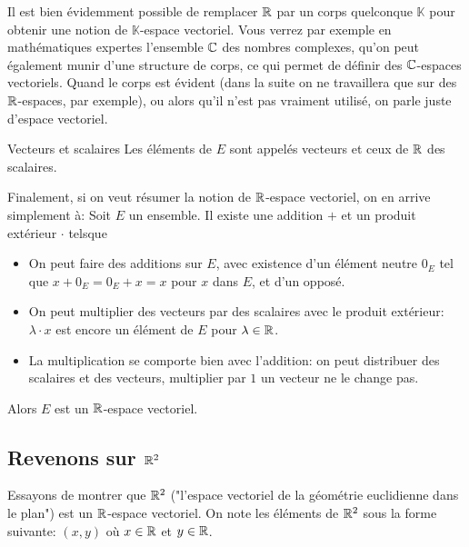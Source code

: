\documentclass{classe}
\renewcommand*{\K}{\mathbb{K}}
\begin{document}
Il est bien évidemment possible de remplacer $\mathbb{R}$ par un corps quelconque $\K$ pour obtenir une notion de $\K$-espace vectoriel.
Vous verrez par exemple en mathématiques expertes l'ensemble $\mathbb{C}$ des nombres complexes, qu'on peut également munir d'une structure de corps, ce qui permet de définir des $\mathbb{C}$-espaces vectoriels.
Quand le corps est évident (dans la suite on ne travaillera que sur des $\mathbb{R}$-espaces, par exemple), ou alors qu'il n'est pas vraiment utilisé, on parle juste d'espace vectoriel.

\begin{définition}{Vecteurs et scalaires}{}
	Les éléments de $E$ sont appelés vecteurs et ceux de $\mathbb{R}$ des scalaires.
\end{définition}

Finalement, si on veut résumer la notion de $\mathbb{R}$-espace vectoriel, on en arrive simplement à:
Soit $E$ un ensemble. Il existe une addition $+$ et un produit extérieur $\cdot$ telsque
\begin{itemize}
		\item On peut faire des additions sur $E$, avec existence d'un élément neutre $0_E$ tel que $x + 0_E = 0_E + x = x$ pour $x$ dans $E$, et d'un opposé.
		\item On peut multiplier des vecteurs par des scalaires avec le produit extérieur: $\lambda\cdot x$ est encore un élément de $E$ pour $\lambda \in \mathbb{R}$.
		\item La multiplication se comporte bien avec l'addition: on peut distribuer des scalaires et des vecteurs, multiplier par $1$ un vecteur ne le change pas.
\end{itemize}
Alors $E$ est un $\mathbb{R}$-espace vectoriel.

\subsection{Revenons sur $\mathbb{R}^2$}

Essayons de montrer que $\mathbb{R}^2$ ("l'espace vectoriel de la géométrie euclidienne dans le plan") est un $\mathbb{R}$-espace vectoriel. On note les éléments de $\mathbb{R}^2$ sous la forme suivante: $(x, y)$ où $x\in\mathbb{R}$ et $y\in\mathbb{R}$.

\end{document}
